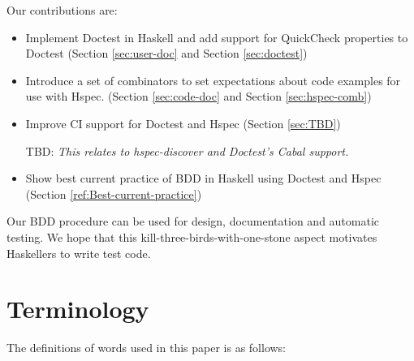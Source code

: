 \documentclass[preprint]{sigplanconf}
\begin{document}
Our contributions are:

\begin{itemize}
\item
    Implement Doctest in Haskell and add support for QuickCheck properties to Doctest (Section
    \ref{sec:user-doc} and Section \ref{sec:doctest})

\item
    Introduce a set of combinators to set expectations about
    code examples for use with Hspec. (Section \ref{sec:code-doc} and Section \ref{sec:hspec-comb})

\item
    Improve CI support for Doctest and Hspec (Section \ref{sec:TBD})

    TBD:
    \emph{This relates to hspec-discover and Doctest's Cabal support.}

\item
    Show best current practice of BDD in Haskell using Doctest and
    Hspec (Section \ref{ref:Best-current-practice})

\end{itemize}

\noindent Our BDD procedure
can be used for design, documentation and automatic testing.
We hope that this kill-three-birds-with-one-stone aspect
motivates Haskellers to write test code.

\section{Terminology}

The definitions of words used in this paper is as follows:
\end{document}
